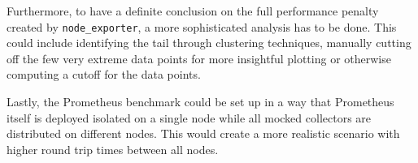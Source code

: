 Furthermore, to have a definite conclusion on the full performance penalty created by \texttt{node\_exporter}, a more sophisticated analysis has to be done. This could include identifying the tail through clustering techniques, manually cutting off the few very extreme data points for more insightful plotting or otherwise computing a cutoff for the data points.

Lastly, the Prometheus benchmark could be set up in a way that Prometheus itself is deployed isolated on a single node while all mocked collectors are distributed on different nodes. This would create a more realistic scenario with higher round trip times between all nodes.
